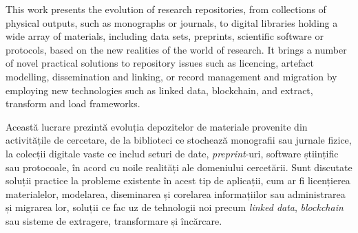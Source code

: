 This work presents the evolution of research repositories, from collections of physical outputs, such as monographs or journals, to digital libraries holding a wide array of materials, including data sets, preprints, scientific software or protocols, based on the new realities of the world of research. It brings a number of novel practical solutions to repository issues such as licencing, artefact modelling, dissemination and linking, or record management and migration by employing new technologies such as linked data, blockchain, and extract, transform and load frameworks.\\\par


Această lucrare prezintă evoluția depozitelor de materiale provenite din activitățile de cercetare, de la biblioteci ce stochează monografii sau jurnale fizice, la colecții digitale vaste ce includ seturi de date, \emph{preprint}-uri, software științific sau protocoale, în acord cu noile realități ale domeniului cercetării. Sunt discutate soluții practice la probleme existente în acest tip de aplicații, cum ar fi licențierea materialelor, modelarea, diseminarea și corelarea informațiilor sau administrarea și migrarea lor, soluții ce fac uz de tehnologii noi precum \emph{linked data}, \emph{blockchain} sau sisteme de extragere, transformare și încărcare.  